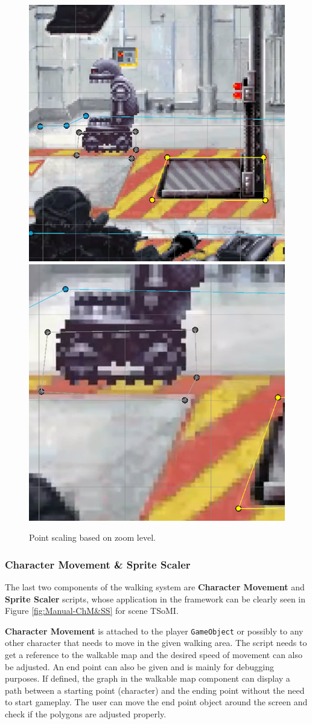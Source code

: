 \begin{figure}[H]
\centering
\includegraphics[width=.48\linewidth]{img/User doc/point_scaling.png}
\includegraphics[width=.48\linewidth]{img/User doc/point_scaling2.png}
\caption{Point scaling based on zoom level.}
\label{fig:Manual-Zoom}
\end{figure}

\subsubsection{Character Movement \& Sprite Scaler}
The last two components of the walking system are \textbf{Character Movement} and \textbf{Sprite Scaler} scripts, whose application in the framework can be clearly seen in Figure \ref{fig:Manual-ChM&SS} for scene TSoMI. 

\textbf{Character Movement} is attached to the player \verb|GameObject| or possibly to any other character that needs to move in the given walking area. The script needs to get a reference to the walkable map and the desired speed of movement can also be adjusted. An end point can also be given and is mainly for debugging purposes. If defined, the graph in the walkable map component can display a path between a starting point (character) and the ending point without the need to start gameplay. The user can move the end point object around the screen and check if the polygons are adjusted properly.

